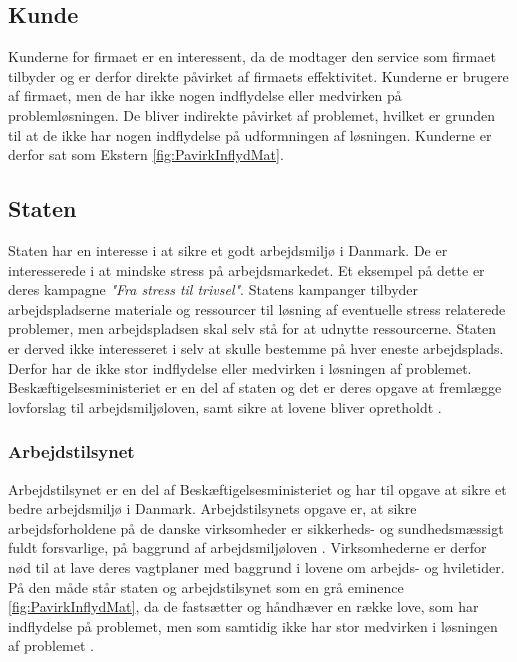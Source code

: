 \subsection{Kunde}
Kunderne for firmaet er en interessent, da de modtager den service som firmaet tilbyder og er derfor direkte påvirket af firmaets effektivitet. Kunderne er brugere af firmaet, men de har ikke nogen indflydelse eller medvirken på problemløsningen. De bliver indirekte påvirket af problemet, hvilket er grunden til at de ikke har nogen indflydelse på udformningen af løsningen. Kunderne er derfor sat som Ekstern \ref{fig:PavirkInflydMat}.

\subsection{Staten}
Staten har en interesse i at sikre et godt arbejdsmiljø i Danmark. De er interesserede i at mindske stress på arbejdsmarkedet. Et eksempel på dette er deres kampagne \textit{"Fra stress til trivsel"}\citep{Arbejdsmiljoe_Arbejdspladser}. Statens kampanger tilbyder arbejdspladserne materiale og ressourcer til løsning af eventuelle stress relaterede problemer, men arbejdspladsen skal selv stå for at udnytte ressourcerne. Staten er derved ikke interesseret i selv at skulle bestemme på hver eneste arbejdsplads. Derfor har de ikke stor indflydelse eller medvirken i løsningen af problemet. Beskæftigelsesministeriet er en del af staten og det er deres opgave at fremlægge lovforslag til arbejdsmiljøloven, samt sikre at lovene bliver opretholdt \citep{Beskaeftigelsesministeriet2002}.

\subsubsection{Arbejdstilsynet}
Arbejdstilsynet er en del af Beskæftigelsesministeriet og har til opgave at sikre et bedre arbejdsmiljø i Danmark. Arbejdstilsynets opgave er, at sikre  arbejdsforholdene på de danske virksomheder er sikkerheds- og sundhedsmæssigt fuldt forsvarlige, på baggrund af arbejdsmiljøloven \citep{Arbejdstilsynet2015}. Virksomhederne er derfor nød til at lave deres vagtplaner med baggrund i lovene om arbejds- og hviletider. På den måde står staten og arbejdstilsynet som en grå eminence \ref{fig:PavirkInflydMat}, da de fastsætter og håndhæver en række love, som har indflydelse på problemet, men som samtidig ikke har stor medvirken i løsningen af problemet \citep{Beskaeftigelsesministeriet2002}.

